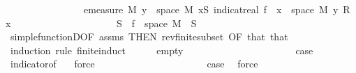 \begin{isabellebody}
\ \ \ \ \ \ \ \ \ \ \ \ \ \ \ \ {\isachardoublequoteopen}emeasure\ M\ {\isacharbraceleft}{\kern0pt}y\ {\isasymin}\ space\ M{\isachardot}{\kern0pt}\ {\isacharparenleft}{\kern0pt}{\isasymSum}x{\isasymin}S{\isachardot}{\kern0pt}\ indicat{\isacharunderscore}{\kern0pt}real\ {\isacharparenleft}{\kern0pt}f\ {\isacharminus}{\kern0pt}{\isacharbackquote}{\kern0pt}\ {\isacharbraceleft}{\kern0pt}x{\isacharbraceright}{\kern0pt}\ {\isasyminter}\ space\ M{\isacharparenright}{\kern0pt}\ y\ {\isacharasterisk}{\kern0pt}\isactrlsub R\ x{\isacharparenright}{\kern0pt}\ {\isasymnoteq}\ {}{\isacharbraceright}{\kern0pt}\ {\isasymnoteq}\ {\isasyminfinity}{\isachardoublequoteclose}\isanewline
\ \ \ \ \ \ \ \ \ \ \ \ \ \ \ \ \ {\isachardoublequoteopen}S\ {\isasymsubseteq}\ f\ {\isacharbackquote}{\kern0pt}\ space\ M{\isachardoublequoteclose}\ \ S\ \isamarkupfalse%
\ simple{\isacharunderscore}{\kern0pt}functionD{\isacharparenleft}{\kern0pt}{}{\isacharparenright}{\kern0pt}{\isacharbrackleft}{\kern0pt}OF\ assms{\isacharparenleft}{\kern0pt}{}{\isacharparenright}{\kern0pt}{\isacharcomma}{\kern0pt}\ THEN\ rev{\isacharunderscore}{\kern0pt}finite{\isacharunderscore}{\kern0pt}subset{\isacharcomma}{\kern0pt}\ OF\ that{\isacharbrackright}{\kern0pt}\ that\ \isanewline
\ \ \isamarkupfalse%
\ {\isacharparenleft}{\kern0pt}induction\ rule{\isacharcolon}{\kern0pt}\ finite{\isacharunderscore}{\kern0pt}induct{\isacharparenright}{\kern0pt}\isanewline
\ \ \ \ \isamarkupfalse%
\ empty\isanewline
\ \ \ \ \isacommand{{\isacharbraceleft}{\kern0pt}}\isamarkupfalse%
\isanewline
\ \ \ \ \ \ \isamarkupfalse%
\ {}\isanewline
\ \ \ \ \ \ \isamarkupfalse%
\ \isamarkupfalse%
\ {\isacharquery}{\kern0pt}case\ \isamarkupfalse%
\ indicator{\isacharbrackleft}{\kern0pt}of\ {\isachardoublequoteopen}{\isacharbraceleft}{\kern0pt}{\isacharbraceright}{\kern0pt}{\isachardoublequoteclose}{\isacharbrackright}{\kern0pt}\ \isamarkupfalse%
\ force\isanewline
\ \ \ \ \isamarkupfalse%
\isanewline
\ \ \ \ \ \ \isamarkupfalse%
\ {}\isanewline
\ \ \ \ \ \ \isamarkupfalse%
\ \isamarkupfalse%
\ {\isacharquery}{\kern0pt}case\ \isamarkupfalse%
\ force\ \isanewline
\ \ \ \ \isamarkupfalse%
\isanewline
\ \ \ \ \ \ \isamarkupfalse%
\ {}\isanewline
\ \ \ \ \ \ \isamarkupfalse%

\end{isabellebody}
